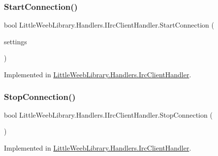 \subsubsection{\texorpdfstring{Start\+Connection()}{StartConnection()}}
{\footnotesize\ttfamily bool Little\+Weeb\+Library.\+Handlers.\+I\+Irc\+Client\+Handler.\+Start\+Connection (\begin{DoxyParamCaption}\item[{\mbox{\hyperlink{class_little_weeb_library_1_1_settings_1_1_irc_settings}{Irc\+Settings}}}]{settings }\end{DoxyParamCaption})}



Implemented in \mbox{\hyperlink{class_little_weeb_library_1_1_handlers_1_1_irc_client_handler_ae463832b8e9aea73f26ed6188a14d92e}{Little\+Weeb\+Library.\+Handlers.\+Irc\+Client\+Handler}}.

\mbox{\label{interface_little_weeb_library_1_1_handlers_1_1_i_irc_client_handler_a2b673db5262a09a26d72ee57e34e5b60}} 
\subsubsection{\texorpdfstring{Stop\+Connection()}{StopConnection()}}
{\footnotesize\ttfamily bool Little\+Weeb\+Library.\+Handlers.\+I\+Irc\+Client\+Handler.\+Stop\+Connection (\begin{DoxyParamCaption}{ }\end{DoxyParamCaption})}



Implemented in \mbox{\hyperlink{class_little_weeb_library_1_1_handlers_1_1_irc_client_handler_a97a617b50a161906a91ce1ea483a1770}{Little\+Weeb\+Library.\+Handlers.\+Irc\+Client\+Handler}}.

\mbox{\label{interface_little_weeb_library_1_1_handlers_1_1_i_irc_client_handler_af1da0e6ed40f306b92dc0952c05cd1fe}} 
